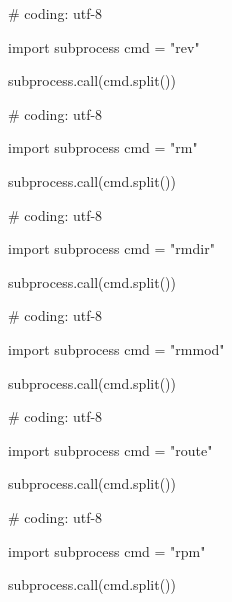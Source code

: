 \begin{mylisting}[label={lst:acpid},language=sh,caption=rev]

# coding: utf-8

import subprocess
cmd = "rev"

subprocess.call(cmd.split())

\end{mylisting}

\begin{mylisting}[label={lst:acpid},language=sh,caption=rm]

# coding: utf-8

import subprocess
cmd = "rm"

subprocess.call(cmd.split())

\end{mylisting}

\begin{mylisting}[label={lst:acpid},language=sh,caption=rmdir]

# coding: utf-8

import subprocess
cmd = "rmdir"

subprocess.call(cmd.split())

\end{mylisting}

\begin{mylisting}[label={lst:acpid},language=sh,caption=rmmod]

# coding: utf-8

import subprocess
cmd = "rmmod"

subprocess.call(cmd.split())

\end{mylisting}

\begin{mylisting}[label={lst:acpid},language=sh,caption=route]

# coding: utf-8

import subprocess
cmd = "route"

subprocess.call(cmd.split())

\end{mylisting}

\begin{mylisting}[label={lst:acpid},language=sh,caption=rpm]

# coding: utf-8

import subprocess
cmd = "rpm"

subprocess.call(cmd.split())

\end{mylisting}

